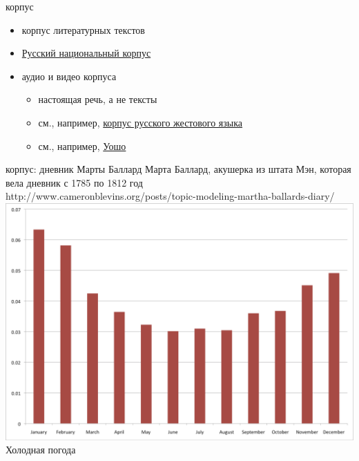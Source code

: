 \documentclass[13pt, t]{beamer}
\begin{document}

\begin{frame}{корпус}
\begin{itemize}
\item корпус литературных текстов
\item \href{http://ruscorpora.ru/}{\color{colorblue} Русский национальный корпус}
\item аудио и видео корпуса \pause
\begin{itemize}
\item настоящая речь, а не тексты
\item см., например, \href{http://rsl.nstu.ru}{\color{colorblue} корпус русского жестового языка}
\item см., например, \href{https://www.youtube.com/watch?v=OUwOvF7TqgA&feature=youtu.be&t=1m25s}{\color{colorblue} Уошо}
\end{itemize}
\end{itemize}
\end{frame}

\begin{frame}{корпус: дневник Марты Баллард}
Марта Баллард, акушерка из штата Мэн, которая вела дневник с 1785 по 1812 год\\
{\tiny http://www.cameronblevins.org/posts/topic-modeling-martha-ballards-diary/}
\includegraphics[width=0.8\linewidth]{images/01-ballard}\\
\pause
Холодная погода
\end{frame}
\end{document}
